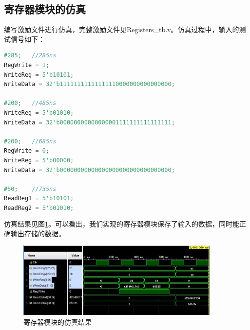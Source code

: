 \documentclass[UTF8]{ctexart}
\begin{document}
\subsection{寄存器模块的仿真}
编写激励文件进行仿真，完整激励文件见Registers\_tb.v。仿真过程中，输入的测试信号如下：
\begin{lstlisting}[language=verilog]
#285;   //285ns
RegWrite = 1;
WriteReg = 5'b10101;
WriteData = 32'b11111111111111110000000000000000;

#200;   //485ns
WriteReg = 5'b01010;
WriteData = 32'b00000000000000001111111111111111;

#200;   //685ns
RegWrite = 0;
WriteReg = 5'b00000;
WriteData = 32'b00000000000000000000000000000000;

#50;    //735ns
ReadReg1 = 5'b10101;
ReadReg2 = 5'b01010;
\end{lstlisting}\par
仿真结果见图\ref{fig:sim-reg}。可以看出，我们实现的寄存器模块保存了输入的数据，同时能正确输出存储的数据。
\begin{figure}[H]
    \centering
    \includegraphics[width=0.9\textwidth]{fig-sim-reg.jpg}
    \caption{寄存器模块的仿真结果}
    \label{fig:sim-reg}
\end{figure}
\end{document}
